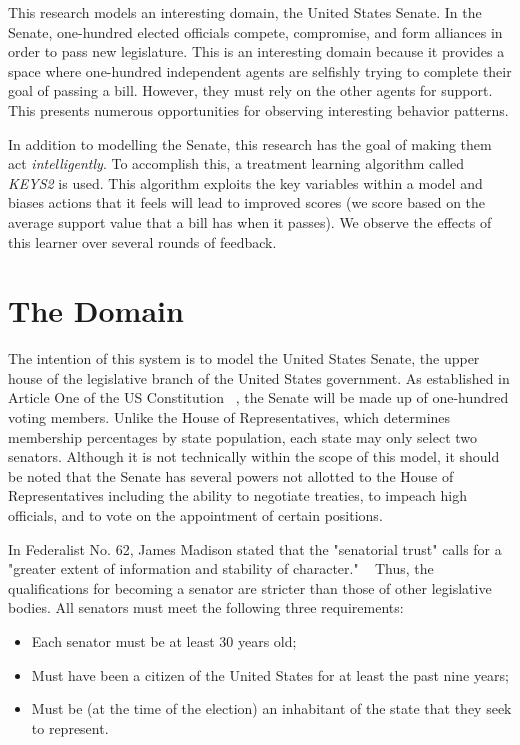 \documentclass{sig-alternate}
\newcounter{over}
\newenvironment{smallitem}
 {\setlength{\topsep}{0pt}
  \setlength{\partopsep}{0pt}
  \setlength{\parskip}{0pt}
  \begin{itemize}
   \setlength{\leftmargin}{.2in}
  \setlength{\parsep}{0pt}
  \setlength{\parskip}{0pt}
  \setlength{\itemsep}{0pt}}
 {\end{itemize}}
\newcommand{\bi}{\begin{smallitem}}
\newcommand{\ei}{\end{smallitem}}
\begin{document}
This research models an interesting domain, the United States Senate. In the Senate, one-hundred elected officials compete, compromise, and
form alliances in order to pass new legislature. This is an interesting domain because it provides a space where one-hundred independent 
agents are selfishly trying to complete their goal of passing a bill. However, they must rely on the other agents for support. This 
presents numerous opportunities for observing interesting behavior patterns. 

In addition to modelling the Senate, this research has the goal of making them act {\em intelligently}. To accomplish this, a 
treatment learning algorithm called {\em KEYS2} is used. This algorithm exploits the key variables within a model and biases actions
that it feels will lead to improved scores (we score based on the average support value that a bill has when it passes). We observe the effects
of this learner over several rounds of feedback.

\section{The Domain}

The intention of this system is to model the United States Senate, the upper house of the legislative branch of the United States government. As established in Article One of the US Constitution ~\cite{const}, the Senate will be made up of one-hundred voting members. Unlike the House of Representatives, which determines membership percentages by state population, each state may only select two senators. Although it is not technically within the scope of this model, it should be noted that the Senate has several powers not allotted to the House of Representatives including the ability to negotiate treaties, to impeach high officials, and to vote on the appointment of certain positions.

In Federalist No. 62, James Madison stated that the "senatorial trust" calls for a "greater extent of information and stability of character." ~\cite{mad62} Thus, the qualifications for becoming a senator are stricter than those of other legislative bodies. All senators must meet the following three requirements: 
\bi
\item Each senator must be at least 30 years old;
\item Must have been a citizen of the United States for at least the past nine years;
\item Must be (at the time of the election) an inhabitant of the state that they seek to represent. 
\ei
\end{document}
